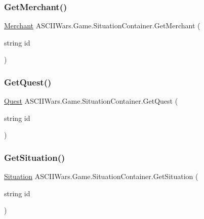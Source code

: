 \subsubsection{\texorpdfstring{Get\+Merchant()}{GetMerchant()}}
{\footnotesize\ttfamily \hyperlink{class_a_s_c_i_i_wars_1_1_game_1_1_merchant}{Merchant} A\+S\+C\+I\+I\+Wars.\+Game.\+Situation\+Container.\+Get\+Merchant (\begin{DoxyParamCaption}\item[{string}]{id }\end{DoxyParamCaption})\hspace{0.3cm}{\ttfamily [inline]}}

\hypertarget{class_a_s_c_i_i_wars_1_1_game_1_1_situation_container_ac15145909b7206c2c2a7aa13f770a9a0}{}\label{class_a_s_c_i_i_wars_1_1_game_1_1_situation_container_ac15145909b7206c2c2a7aa13f770a9a0} 
\subsubsection{\texorpdfstring{Get\+Quest()}{GetQuest()}}
{\footnotesize\ttfamily \hyperlink{class_a_s_c_i_i_wars_1_1_game_1_1_quest}{Quest} A\+S\+C\+I\+I\+Wars.\+Game.\+Situation\+Container.\+Get\+Quest (\begin{DoxyParamCaption}\item[{string}]{id }\end{DoxyParamCaption})\hspace{0.3cm}{\ttfamily [inline]}}

\hypertarget{class_a_s_c_i_i_wars_1_1_game_1_1_situation_container_aad379806144d48b5d6c66e409065473c}{}\label{class_a_s_c_i_i_wars_1_1_game_1_1_situation_container_aad379806144d48b5d6c66e409065473c} 
\subsubsection{\texorpdfstring{Get\+Situation()}{GetSituation()}}
{\footnotesize\ttfamily \hyperlink{class_a_s_c_i_i_wars_1_1_game_1_1_situation}{Situation} A\+S\+C\+I\+I\+Wars.\+Game.\+Situation\+Container.\+Get\+Situation (\begin{DoxyParamCaption}\item[{string}]{id }\end{DoxyParamCaption})\hspace{0.3cm}{\ttfamily [inline]}}

